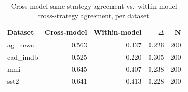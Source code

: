 \begin{table}[t]
\centering
\caption{Cross-model same-strategy agreement vs.\ within-model cross-strategy agreement, per dataset.}
\label{tab:crossmodel}
\begin{tabular}{lrrrr}
\toprule
Dataset & Cross-model & Within-model & $\Delta$ & N \\
\midrule
ag_news & 0.563 & 0.337 & 0.226 & 200 \\
cad_imdb & 0.525 & 0.220 & 0.305 & 200 \\
mnli & 0.645 & 0.407 & 0.238 & 200 \\
sst2 & 0.641 & 0.413 & 0.228 & 200 \\
\bottomrule
\end{tabular}
\end{table}
